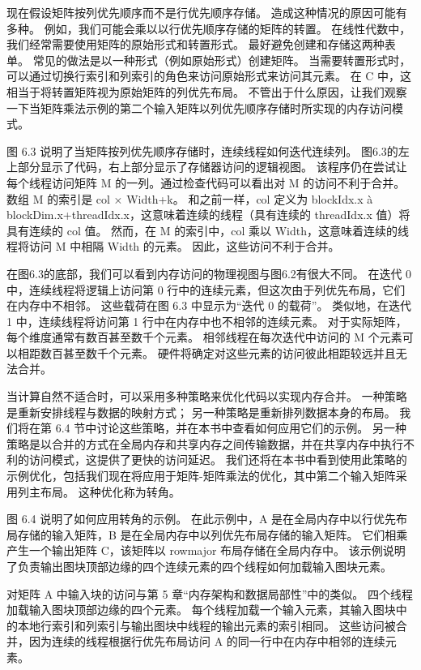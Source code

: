 现在假设矩阵按列优先顺序而不是行优先顺序存储。 造成这种情况的原因可能有多种。 例如，我们可能会乘以以行优先顺序存储的矩阵的转置。 在线性代数中，我们经常需要使用矩阵的原始形式和转置形式。 最好避免创建和存储这两种表单。 常见的做法是以一种形式（例如原始形式）创建矩阵。 当需要转置形式时，可以通过切换行索引和列索引的角色来访问原始形式来访问其元素。 在 C 中，这相当于将转置矩阵视为原始矩阵的列优先布局。 不管出于什么原因，让我们观察一下当矩阵乘法示例的第二个输入矩阵以列优先顺序存储时所实现的内存访问模式。

图 6.3 说明了当矩阵按列优先顺序存储时，连续线程如何迭代连续列。 图6.3的左上部分显示了代码，右上部分显示了存储器访问的逻辑视图。 该程序仍在尝试让每个线程访问矩阵 M 的一列。通过检查代码可以看出对 M 的访问不利于合并。 数组 M 的索引是 col × Width+k。 和之前一样，col 定义为 blockIdx.x à blockDim.x+threadIdx.x，这意味着连续的线程（具有连续的 threadIdx.x 值）将具有连续的 col 值。 然而，在 M 的索引中，col 乘以 Width，这意味着连续的线程将访问 M 中相隔 Width 的元素。 因此，这些访问不利于合并。

在图6.3的底部，我们可以看到内存访问的物理视图与图6.2有很大不同。 在迭代 0 中，连续线程将逻辑上访问第 0 行中的连续元素，但这次由于列优先布局，它们在内存中不相邻。 这些载荷在图 6.3 中显示为“迭代 0 的载荷”。 类似地，在迭代 1 中，连续线程将访问第 1 行中在内存中也不相邻的连续元素。 对于实际矩阵，每个维度通常有数百甚至数千个元素。 相邻线程在每次迭代中访问的 M 个元素可以相距数百甚至数千个元素。 硬件将确定对这些元素的访问彼此相距较远并且无法合并。

当计算自然不适合时，可以采用多种策略来优化代码以实现内存合并。 一种策略是重新安排线程与数据的映射方式； 另一种策略是重新排列数据本身的布局。 我们将在第 6.4 节中讨论这些策略，并在本书中查看如何应用它们的示例。 另一种策略是以合并的方式在全局内存和共享内存之间传输数据，并在共享内存中执行不利的访问模式，这提供了更快的访问延迟。 我们还将在本书中看到使用此策略的示例优化，包括我们现在将应用于矩阵-矩阵乘法的优化，其中第二个输入矩阵采用列主布局。 这种优化称为转角。

图 6.4 说明了如何应用转角的示例。 在此示例中，A 是在全局内存中以行优先布局存储的输入矩阵，B 是在全局内存中以列优先布局存储的输入矩阵。 它们相乘产生一个输出矩阵 C，该矩阵以 rowmajor 布局存储在全局内存中。 该示例说明了负责输出图块顶部边缘的四个连续元素的四个线程如何加载输入图块元素。

对矩阵 A 中输入块的访问与第 5 章“内存架构和数据局部性”中的类似。 四个线程加载输入图块顶部边缘的四个元素。 每个线程加载一个输入元素，其输入图块中的本地行索引和列索引与输出图块中线程的输出元素的索引相同。 这些访问被合并，因为连续的线程根据行优先布局访问 A 的同一行中在内存中相邻的连续元素。

